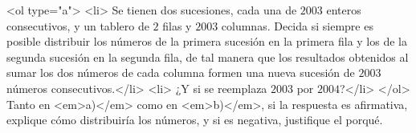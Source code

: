 <ol type="a">
  <li> Se tienen dos sucesiones, cada una de $2003$ enteros consecutivos, y un tablero de $2$ filas y $2003$ columnas. Decida si siempre es posible distribuir los números de la primera sucesión en la primera fila y los de la segunda sucesión en la segunda fila, de tal manera que los resultados obtenidos al sumar los dos números de cada columna formen una nueva sucesión de $2003$ números consecutivos.</li>
  <li> ¿Y si se reemplaza $2003$ por $2004$?</li>
</ol>
Tanto en <em>a)</em> como en <em>b)</em>, si la respuesta es afirmativa, explique cómo distribuiría los números, y si es negativa, justifique el porqué.
